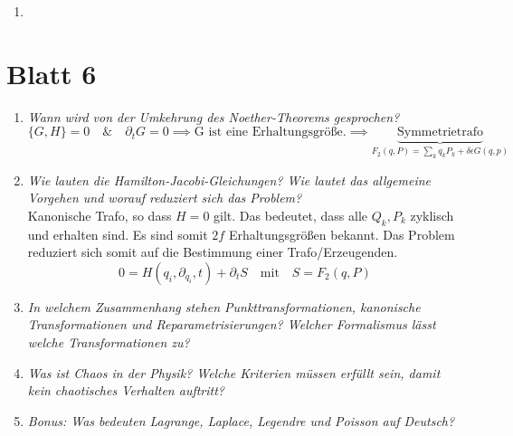 \begin{enumerate}
    \item 
\end{enumerate}


\newpage

\section*{Blatt 6}
\begin{enumerate}
    \item \textit{Wann wird von der Umkehrung des Noether-Theorems gesprochen?} \\
        \begin{equation*}
            \{G,H\}=0 \quad \& \quad \partial_t G =0 \implies \text{G ist eine Erhaltungsgröße.} \implies \underbrace{\text{Symmetrietrafo}}_{F_2(q,P)= \sum_k q_k P_k + \delta \epsilon G(q,p)}
        \end{equation*}
    \item \textit{Wie lauten die Hamilton-Jacobi-Gleichungen? Wie lautet das allgemeine Vorgehen und worauf reduziert sich das Problem?} \\
        Kanonische Trafo, so dass $H=0$ gilt. Das bedeutet, dass alle $Q_k, P_k$ zyklisch und erhalten sind. Es sind somit $2f$ Erhaltungsgrößen bekannt. Das Problem reduziert sich somit auf die Bestimmung einer Trafo/Erzeugenden.
        \begin{equation*}
            0=H(q_i, \partial_{q_i}, t)+\partial_t S \quad \text{mit} \quad S=F_2(q, P)
        \end{equation*}
    \item \textit{In welchem Zusammenhang stehen Punkttransformationen, kanonische Transformationen und Reparametrisierungen? Welcher Formalismus lässt welche Transformationen zu?} \\
    \item \textit{Was ist Chaos in der Physik? Welche Kriterien müssen erfüllt sein, damit kein chaotisches Verhalten auftritt?} \\
    \item \textit{Bonus: Was bedeuten Lagrange, Laplace, Legendre und Poisson auf Deutsch?} \\
\end{enumerate}

